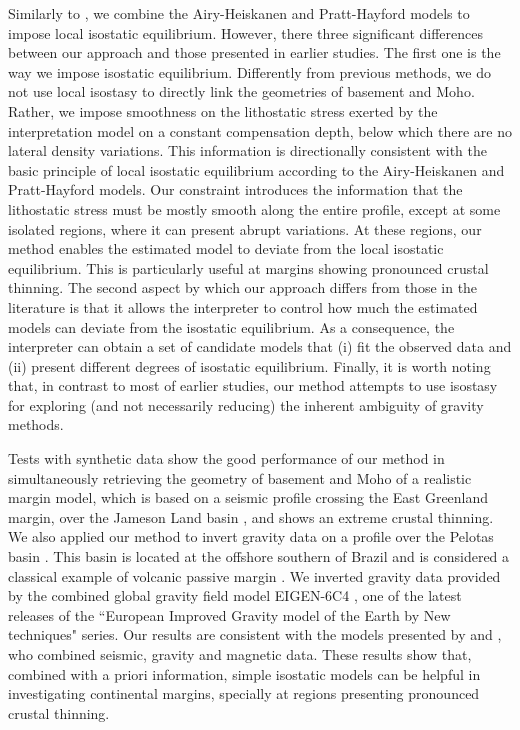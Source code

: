 \documentclass[manuscript,revised]{geophysics}
\begin{document}
Similarly to \citet{ferderer-etal2017}, we combine the Airy-Heiskanen and Pratt-Hayford
models to impose local isostatic equilibrium. However, there three significant differences
between our approach and those presented in earlier studies.
The first one is the way we impose isostatic equilibrium. Differently from previous 
methods, we do not use local isostasy to directly link the geometries of basement and Moho.
Rather, we impose smoothness on the lithostatic stress exerted by the interpretation 
model on a constant compensation depth, below which there are no lateral density variations.
This information is directionally consistent with the basic principle of 
local isostatic equilibrium according to the Airy-Heiskanen and Pratt-Hayford models.
Our constraint introduces the information that the lithostatic stress must be mostly 
smooth along the entire profile, except at some isolated regions, where it can present abrupt
variations. At these regions, our method enables the estimated model to deviate from the 
local isostatic equilibrium.
This is particularly useful at margins showing pronounced crustal thinning.
The second aspect by which our approach differs from those in the literature
is that it allows the interpreter to control how much the 
estimated models can deviate from the isostatic equilibrium.
As a consequence, the interpreter can obtain a set of candidate models 
that (i) fit the observed data and (ii) present different degrees of isostatic 
equilibrium.
Finally, it is worth noting that, in contrast to most of earlier studies, our method 
attempts to use isostasy for exploring (and not necessarily reducing) the inherent 
ambiguity of gravity methods.

Tests with synthetic data show the good performance of our method in simultaneously
retrieving the geometry of basement and Moho of a realistic margin model,
which is based on a seismic profile crossing the East Greenland margin,
over the Jameson Land basin \citep{peron-etal2013}, and shows an extreme crustal thinning.
We also applied our method to invert gravity data on a profile over the Pelotas basin 
\citep{stica-etal2014}. This basin is located at the offshore southern of Brazil and is 
considered a classical example of volcanic passive margin \citep{geoffroy2005}. 
We inverted gravity data provided by the combined global gravity field model EIGEN-6C4
\citep{forste2014}, one of the latest releases of the ``European Improved Gravity model of 
the Earth by New techniques" series.
Our results are consistent with the models presented by \citet{stica-etal2014} and
\citet{zalan2015}, who combined seismic, gravity and magnetic data.
These results show that, combined with a priori information, simple isostatic models 
can be helpful in investigating continental margins, specially at regions presenting pronounced 
crustal thinning.
\end{document}
